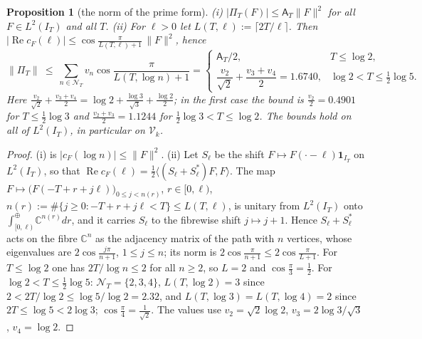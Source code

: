 \documentclass[11pt]{amsart}
\newtheorem{proposition}[theorem]{Proposition}
\theoremstyle{definition}
\theoremstyle{remark}
\newcommand{\C}{\mathbb C}
\newcommand{\Rel}{\operatorname{Re}}
\newcommand{\IT}{I_T}
\newcommand{\cF}{c_F}
\newcommand{\NT}{\mathcal N_T}
\newcommand{\Aconst}{\mathsf A_T}
\newcommand{\PiT}{\Pi_T}
\begin{document}
\begin{proposition}[the norm of the prime form]\label{prop:coer-prime}
\emph{(i)} $|\PiT(F)|\le\Aconst\|F\|^2$ for all $F\in L^2(\IT)$ and all $T$.
\emph{(ii)} For $\ell>0$ let $L(T,\ell):=\lceil2T/\ell\rceil$. Then $|\Rel\cF(\ell)|\le\cos\frac{\pi}{L(T,\ell)+1}\,\|F\|^2$,
hence
\[
\|\PiT\|\ \le\ \sum_{n\in\NT}v_n\cos\frac\pi{L(T,\log n)+1}
=\begin{cases}
\Aconst/2, & T\le\log2,\\[2pt]
\dfrac{v_2}{\sqrt2}+\dfrac{v_3+v_4}2=1.6740, & \log2<T\le\tfrac12\log5 .
\end{cases}
\]
Here $\frac{v_2}{\sqrt2}+\frac{v_3+v_4}2=\log2+\frac{\log3}{\sqrt3}+\frac{\log2}2$; in the first case the bound is
$\frac{v_2}2=0.4901$ for $T\le\frac12\log3$ and $\frac{v_2+v_3}2=1.1244$ for $\frac12\log3<T\le\log2$. The bounds hold on all of $L^2(\IT)$, in particular on $\mathcal V_k$.
\end{proposition}
\begin{proof}
(i) is $|\cF(\log n)|\le\|F\|^2$. (ii) Let $S_\ell$ be the shift $F\mapsto F(\cdot-\ell)\mathbf 1_{\IT}$ on
$L^2(\IT)$, so that $\Rel\cF(\ell)=\frac12\langle(S_\ell+S_\ell^*)F,F\rangle$. The map
$F\mapsto\big(F(-T+r+j\ell)\big)_{0\le j<n(r)}$, $r\in[0,\ell)$, $n(r):=\#\{j\ge0:-T+r+j\ell<T\}\le L(T,\ell)$, is unitary
from $L^2(\IT)$ onto $\int^\oplus_{[0,\ell)}\C^{n(r)}dr$, and it carries $S_\ell$ to the fibrewise shift $j\mapsto j+1$.
Hence $S_\ell+S_\ell^*$ acts on the fibre $\C^{n}$ as the adjacency matrix of the path with $n$ vertices, whose
eigenvalues are $2\cos\frac{j\pi}{n+1}$, $1\le j\le n$; its norm is $2\cos\frac\pi{n+1}\le2\cos\frac\pi{L+1}$. For
$T\le\log2$ one has $2T/\log n\le2$ for all $n\ge2$, so $L=2$ and $\cos\frac\pi3=\frac12$. For $\log2<T\le\frac12\log5$:
$\NT=\{2,3,4\}$, $L(T,\log2)=3$ since $2<2T/\log2\le\log5/\log2=2.32$, and $L(T,\log3)=L(T,\log4)=2$ since
$2T\le\log5<2\log3$; $\cos\frac\pi4=\frac1{\sqrt2}$. The values use $v_2=\sqrt2\log2$, $v_3=2\log3/\sqrt3$, $v_4=\log2$.
\end{proof}
\end{document}
